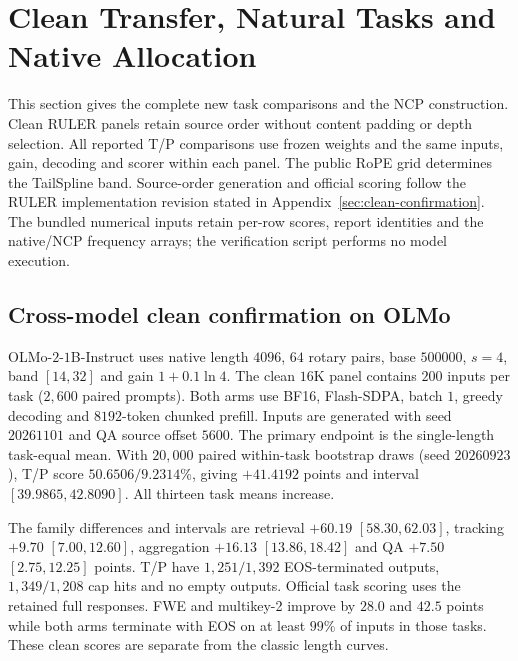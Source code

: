 \section{Clean Transfer, Natural Tasks and Native Allocation}
\label{sec:completed-evidence}
This section gives the complete new task comparisons and the NCP construction.
Clean RULER panels retain source order without content padding or depth
selection. All reported T/P comparisons use frozen weights and the same inputs,
gain, decoding and scorer within each panel. The public RoPE grid determines
the TailSpline band. Source-order generation and official scoring follow the
RULER implementation revision stated in Appendix~\ref{sec:clean-confirmation}.
The bundled numerical inputs retain per-row scores, report identities and the
native/NCP frequency arrays; the verification script performs no model execution.

\subsection{Cross-model clean confirmation on OLMo}
\label{sec:olmo-clean-new}
OLMo-$2$-$1$B-Instruct uses native length $4096$, $64$ rotary pairs, base
$500000$, $s=4$, band $[14,32]$ and gain $1+0.1\ln4$. The clean $16$K panel
contains $200$ inputs per task ($2{,}600$ paired prompts). Both arms use BF16,
Flash-SDPA, batch $1$, greedy decoding and $8192$-token chunked prefill.
Inputs are generated with seed $20261101$ and QA source offset $5600$.
The primary endpoint is the single-length task-equal mean. With $20{,}000$
paired within-task bootstrap draws (seed $20260923$), T/P score
$50.6506/9.2314\%$, giving $+41.4192$ points and interval
$[39.9865,42.8090]$. All thirteen task means increase.

The family differences and intervals are retrieval $+60.19$ $[58.30,62.03]$,
tracking $+9.70$ $[7.00,12.60]$, aggregation $+16.13$ $[13.86,18.42]$ and
QA $+7.50$ $[2.75,12.25]$ points. T/P have $1{,}251/1{,}392$ EOS-terminated
outputs, $1{,}349/1{,}208$ cap hits and no empty outputs. Official task scoring
uses the retained full responses. FWE and multikey-2 improve by $28.0$ and
$42.5$ points while both arms terminate with EOS on at least $99\%$ of inputs
in those tasks. These clean scores are separate from the classic length curves.
\FloatBarrier


